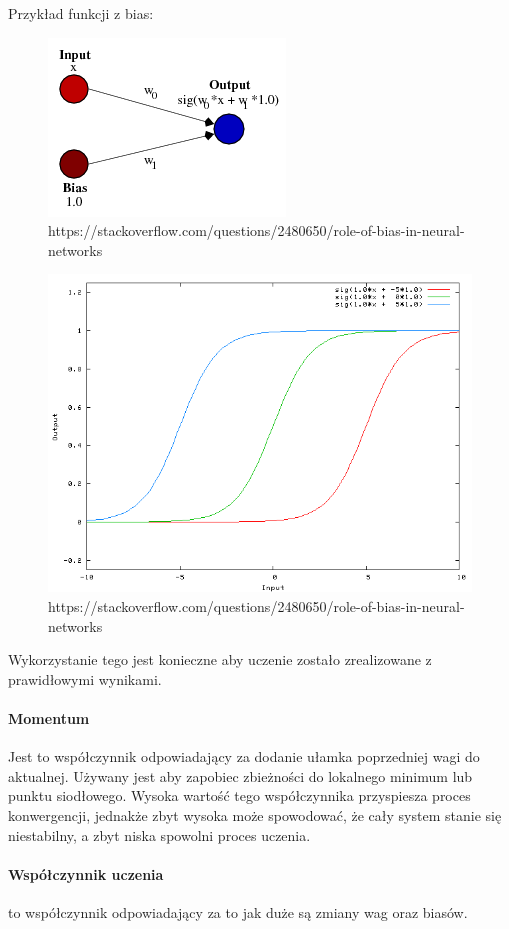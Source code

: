 \documentclass[12pt,a4paper]{article}
\begin{document}
Przykład funkcji z bias:
\begin{figure}[H]
\centering
\includegraphics[scale=0.7]{biases_03}
\caption{https://stackoverflow.com/questions/2480650/role-of-bias-in-neural-networks}
\end{figure}
\begin{figure}[H]
\centering
\includegraphics[scale=0.5]{biases_04}
\caption{https://stackoverflow.com/questions/2480650/role-of-bias-in-neural-networks}
\end{figure}
Wykorzystanie tego jest konieczne aby uczenie zostało zrealizowane z prawidłowymi wynikami.
\paragraph*{Momentum} Jest to współczynnik odpowiadający za dodanie ułamka poprzedniej wagi do aktualnej. Używany jest aby zapobiec zbieżności do lokalnego minimum lub punktu siodłowego. Wysoka wartość tego współczynnika przyspiesza proces konwergencji, jednakże zbyt wysoka może spowodować, że cały system stanie się niestabilny, a zbyt niska spowolni proces uczenia.
\paragraph*{Współczynnik uczenia} to współczynnik odpowiadający za to jak duże są zmiany wag oraz biasów.
\end{document}
